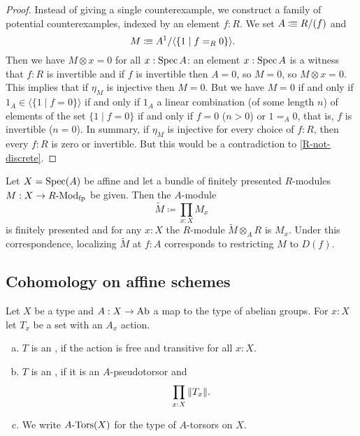 \begin{proof}
  Instead of giving a single counterexample,
  we construct a family of potential counterexamples,
  indexed by an element $f : R$.
  We set $A \vcentcolon\mspace{-1.2mu}\equiv R/(f)$ and
  \[ M \colonequiv A^1 / \langle \{ 1 \mid f =_R 0 \} \rangle \rlap{.} \]
  Then we have $M \otimes x = 0$ for all $x : \operatorname{Spec} A$:
  an element $x : \operatorname{Spec} A$ is a witness that $f : R$ is invertible
  and if $f$ is invertible then $A = 0$, so $M = 0$, so $M \otimes x = 0$.
  This implies that
  if $\eta_M$ is injective
  then $M = 0$.
  But we have $M = 0$ if and only if
  $1_A \in \langle \{ 1 \mid f = 0 \} \rangle$
  if and only if
  $1_A$ a linear combination (of some length $n$)
  of elements of the set $\{ 1 \mid f = 0 \}$
  if and only if
  $f = 0$ ($n > 0$) or
  $1 =_A 0$, that is, $f$ is invertible ($n = 0$).
  In summary,
  if $\eta_M$ is injective for every choice of $f : R$,
  then every $f : R$ is zero or invertible.
  But this would be a contradiction to \cref{R-not-discrete}.
\end{proof}

\begin{theorem}%
  \label{fp-module}
  Let $X=\operatorname{Spec}(A)$ be affine and
  let a bundle of finitely presented $R$-modules $M : X\to R\text{-}\mathrm{Mod}_{\text{fp}}$ be given.
  Then the $A$-module
  \[ \tilde{M}\coloneqq\prod_{x:X}M_x \]
  is finitely presented and for any $x:X$ the $R$-module $\tilde{M}\otimes_A R$ is $M_x$.
  Under this correspondence, localizing $\tilde{M}$ at $f:A$ corresponds to restricting $M$ to $D(f)$.
\end{theorem}

\subsection{Cohomology on affine schemes}

\begin{definition}%
  \label{torsor}
  Let $X$ be a type and $A:X\to \operatorname{Ab}$ a map to the type of abelian groups.
  For $x:X$ let $T_x$ be a set with an $A_x$ action.
  \begin{enumerate}[(a)]
  \item $T$ is an , if the action is free and transitive for all $x:X$.
  \item $T$ is an , if it is an $A$-pseudotorsor and
    \[ \prod_{x:X} \| T_x \| \rlap{.}\]
  \item We write $A\text{-}\mathrm{Tors}(X)$ for the type of $A$-torsors on $X$.
  \end{enumerate}
\end{definition}

